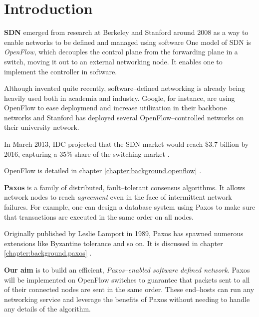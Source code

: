 \chapter{Introduction}


\textbf{\acf{SDN}} \cite{Casado:2005:VNS:1047344.1047383} emerged from
research at Berkeley and Stanford around 2008 as a way to enable networks to
be defined and managed using software
One model of \acs{SDN} is \textit{OpenFlow}, which decouples the control
plane from the forwarding plane in a switch, moving it out to an external
networking node.  It enables one to implement the controller in software.

Although invented quite recently, software--defined networking is already
being heavily used both in academia and industry.  Google, for instance, are
using OpenFlow to ease deploymend and increase utilization in their backbone
networks \cite{crabbe2012sdn} and Stanford has deployed several
OpenFlow--controlled networks on their university network.

In March 2013, IDC projected that the SDN market would
  reach \${}3.7 billion by 2016, capturing a 35\%{} share of the switching
  market \cite{Kirkpatrick:2013:SN:2500468.2500473}.

OpenFlow is detailed in chapter \ref{chapter:background.openflow}
.

\textbf{Paxos} \cite{Lamport:1998:PP:279227.279229} is a
family of distributed, fault--tolerant consensus algorithms.  It allows
network nodes to reach \textit{agreement} even in the face of intermittent
network failures.  For example, one can design a database system using Paxos
to make sure that transactions are executed in the same order on all nodes.

Originally published by Leslie Lamport in 1989, Paxos
has spawned numerous extensions like Byzantine tolerance and so on.  It is
discussed in chapter \ref{chapter:background.paxos} .

\textbf{Our aim} is to build an efficient, \textit{Paxos--enabled software defined
network}.  Paxos will be implemented on OpenFlow switches to guarantee that
packets sent to all of their connected nodes are sent in the same order.
These end--hosts can run any networking service and leverage the benefits of
Paxos without needing to handle any details of the algorithm.


